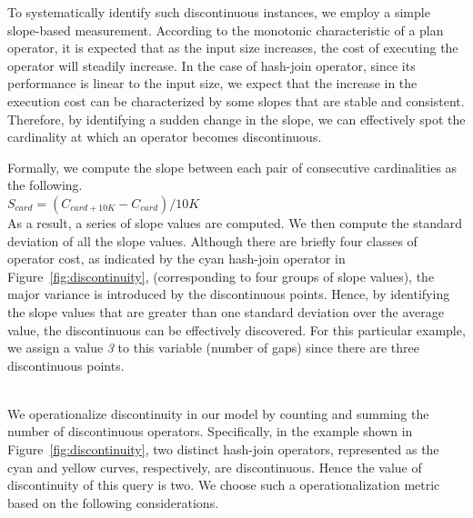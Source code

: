 To systematically identify such discontinuous instances, we employ a simple
slope-based measurement. According to the monotonic characteristic
of a plan operator, it is expected that as the input size increases,
the cost of executing the operator will steadily increase. In the case
of hash-join operator, since its performance is linear to the input size,
we expect that the increase in the execution cost can be characterized by
some slopes that are stable and consistent.
Therefore, by identifying a sudden change in the slope, we can effectively
spot the cardinality at which an operator becomes discontinuous.

Formally, we compute the slope between each pair of consecutive cardinalities
as the following.\\
$S_{card} = (C_{card + 10K} - C_{card}) / 10K$\\

As a result, a series of slope values are computed.
We then compute the standard deviation of all the slope values. Although
there are briefly four classes of operator cost, as indicated by the cyan
hash-join operator in Figure~\ref{fig:discontinuity}, (corresponding to four
groups of slope values), the major variance is introduced by the discontinuous
points. Hence, by identifying the slope values that are greater than one
standard deviation over the average value, the discontinuous can be effectively
discovered. For this particular example, we assign a value {\em 3} to this
variable (number of gaps) since there are three discontinuous points.

\\
We operationalize discontinuity in our model by counting and summing the
number of discontinuous operators. Specifically, in the example shown in
Figure~\ref{fig:discontinuity}, two distinct hash-join operators, represented
as the cyan and yellow curves, respectively, are discontinuous. Hence the
value of discontinuity of this query is two. We choose such a
operationalization metric based on the following considerations.

